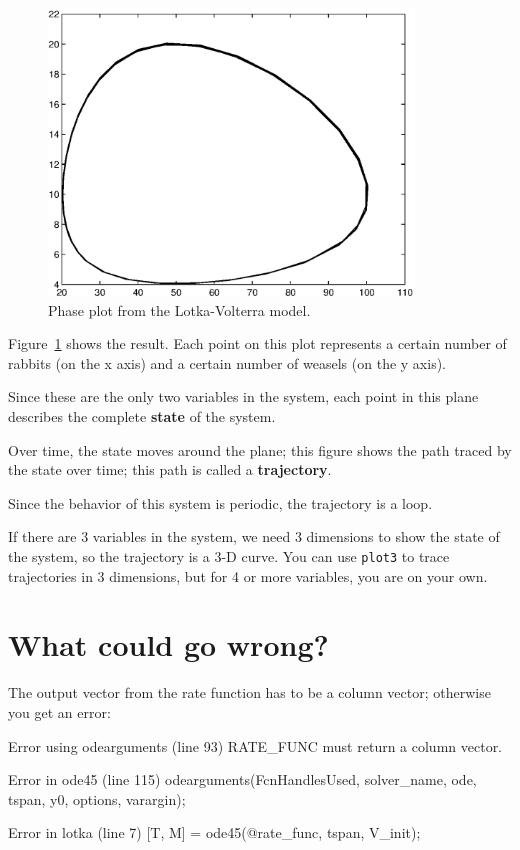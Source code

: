 \documentclass[
]{book}
\numberwithin{Answer}{chapter}
\numberwithin{Exercise}{chapter}
\begin{document}
\begin{figure}
\centerline{\includegraphics[height=3in]{figs/phase.eps}}
\caption{Phase plot from the Lotka-Volterra model.}
\label{fig:phase}
\end{figure}

Figure~\ref{fig:phase} shows the result.  Each point on this plot represents a certain number of rabbits (on the
x axis) and a certain number of weasels (on the y axis).

Since these are the only two variables in the system, each point in
this plane describes the complete {\bf state} of the system.


Over time, the state moves around the plane; this figure shows
the path traced by the state over time; this path
is called a {\bf trajectory}.

Since the behavior of this system is periodic, the
trajectory is a loop.

If there are 3 variables in the system, we need 3 dimensions to show
the state of the system, so the trajectory is a 3-D curve.
You can use {\tt plot3} to trace trajectories in 3 dimensions,
but for 4 or more variables, you are on your own.


\section{What could go wrong?}

The output vector from the rate function has to be a column vector; otherwise you get an error:

\begin{code}
Error using odearguments (line 93)
RATE_FUNC must return a column vector.

Error in ode45 (line 115)
  odearguments(FcnHandlesUsed, solver_name, ode, tspan, y0, 
               options, varargin);

Error in lotka (line 7)
    [T, M] = ode45(@rate_func, tspan, V_init);
\end{code}
\end{document}

